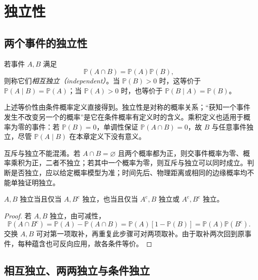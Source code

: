 \section{独立性}
\label{sec:study-independence}

\subsection{两个事件的独立性}
\label{subsec:study-two-event-independence}

\begin{definition}
\label{def:study-event-independence}
若事件 $A,B$ 满足
\begin{equation}
 \mathbb P(A\cap B)=\mathbb P(A)\mathbb P(B),
 \label{eq:study-event-independence}
\end{equation}
则称它们\emph{相互独立（independent）}。当 $\mathbb P(B)>0$ 时，这等价于 $\mathbb P(A\mid B)=\mathbb P(A)$；当 $\mathbb P(A)>0$ 时，也等价于 $\mathbb P(B\mid A)=\mathbb P(B)$。
\end{definition}

上述等价性由条件概率定义直接得到。独立性是对称的概率关系；“获知一个事件发生不改变另一个的概率”是它在条件概率有定义时的含义。乘积定义也适用于概率为零的事件：若 $\mathbb P(B)=0$，单调性保证 $\mathbb P(A\cap B)=0$，故 $B$ 与任意事件独立，尽管 $\mathbb P(A\mid B)$ 在本章定义下没有意义。

互斥与独立不能混淆。若 $A\cap B=\varnothing$ 且两个概率都为正，则交事件概率为零、概率乘积为正，二者不独立；若其中一个概率为零，则互斥与独立可以同时成立。判断是否独立，应以给定概率模型为准；时间先后、物理距离或相同的边缘概率均不能单独证明独立。

\begin{proposition}
\label{prop:study-independence-complements}
$A,B$ 独立当且仅当 $A,B^{\mathrm c}$ 独立，也当且仅当 $A^{\mathrm c},B$ 独立或 $A^{\mathrm c},B^{\mathrm c}$ 独立。
\end{proposition}

\begin{proof}
若 $A,B$ 独立，由可减性，
\[
 \mathbb P(A\cap B^{\mathrm c})
 =\mathbb P(A)-\mathbb P(A\cap B)
 =\mathbb P(A)[1-\mathbb P(B)]
 =\mathbb P(A)\mathbb P(B^{\mathrm c}).
\]
交换 $A,B$ 可对第一项取补，再重复此步骤可对两项取补。由于取补两次回到原事件，每种蕴含也可反向应用，故各条件等价。
\end{proof}

\subsection{相互独立、两两独立与条件独立}
\label{subsec:study-mutual-independence}

